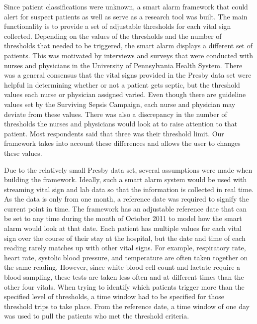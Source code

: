 \documentclass{sig-alternate}
\begin{document}
Since patient classifications were unknown, a smart alarm framework that could alert for suspect patients as well as serve as a research tool was built.  The main functionality is to provide a set of adjustable thresholds for each vital sign collected.  Depending on the values of the thresholds and the number of thresholds that needed to be triggered, the smart alarm displays a different set of patients.  This was motivated by interviews and surveys that were conducted with nurses and physicians in the University of Pennsylvania Health System.  There was a general consensus that the vital signs provided in the Presby data set were helpful in determining whether or not a patient gets septic, but the threshold values each nurse or physician assigned varied.  Even though there are guideline values set by the Surviving Sepsis Campaign, each nurse and physician may deviate from these values.  There was also a discrepancy in the number of thresholds the nurses and physicians would look at to raise attention to that patient.  Most respondents said that three was their threshold limit.  Our framework takes into account these differences and allows the user to changes these values.

Due to the relatively small Presby data set, several assumptions were made when building the framework.  Ideally, such a smart alarm system would be used with streaming vital sign and lab data so that the information is collected in real time.  As the data is only from one month, a reference date was required to signify the current point in time.  The framework has an adjustable reference date that can be set to any time during the month of October 2011 to model how the smart alarm would look at that date.  Each patient has multiple values for each vital sign over the course of their stay at the hospital, but the date and time of each reading rarely matches up with other vital signs.  For example, respiratory rate, heart rate, systolic blood pressure, and temperature are often taken together on the same reading.  However, since white blood cell count and lactate require a blood sampling, these tests are taken less often and at different times than the other four vitals.  When trying to identify which patients trigger more than the specified level of thresholds, a time window had to be specified for those threshold trips to take place.  From the reference date, a time window of one day was used to pull the patients who met the threshold criteria.  
\end{document}
